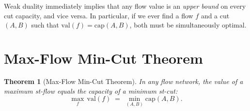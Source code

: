 \documentclass[12pt,a4paper]{report}
\newtheorem{theorem}{Theorem}
\begin{document}
Weak duality immediately implies that any flow value is an
\emph{upper bound} on every cut capacity, and vice versa.
In particular, if we ever find a flow $f$ and a cut $(A,B)$
such that $\mathrm{val}(f) = \mathrm{cap}(A,B)$, both must be
simultaneously optimal.

\section{Max-Flow Min-Cut Theorem}

\begin{theorem}[Max-Flow Min-Cut Theorem]
    In any flow network, the value of a maximum st-flow equals the
    capacity of a minimum st-cut:
    \[
        \max_{f} \,\mathrm{val}(f)
        \;=\;
        \min_{(A,B)} \mathrm{cap}(A,B).
    \]
\end{theorem}
\end{document}
